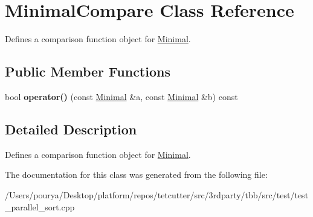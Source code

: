 \hypertarget{classMinimalCompare}{}\section{Minimal\+Compare Class Reference}
\label{classMinimalCompare}


Defines a comparison function object for \hyperlink{classMinimal}{Minimal}.  


\subsection*{Public Member Functions}
\begin{DoxyCompactItemize}
\item 
\hypertarget{classMinimalCompare_ad489759e4073fc042cf567ab6a925015}{}bool {\bfseries operator()} (const \hyperlink{classMinimal}{Minimal} \&a, const \hyperlink{classMinimal}{Minimal} \&b) const \label{classMinimalCompare_ad489759e4073fc042cf567ab6a925015}

\end{DoxyCompactItemize}


\subsection{Detailed Description}
Defines a comparison function object for \hyperlink{classMinimal}{Minimal}. 

The documentation for this class was generated from the following file\+:\begin{DoxyCompactItemize}
\item 
/\+Users/pourya/\+Desktop/platform/repos/tetcutter/src/3rdparty/tbb/src/test/test\+\_\+parallel\+\_\+sort.\+cpp\end{DoxyCompactItemize}
